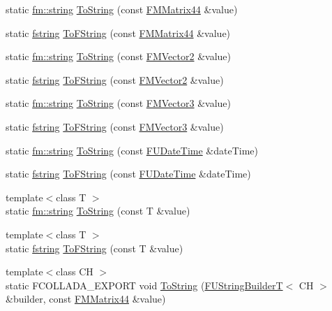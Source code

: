 \begin{DoxyCompactItemize}
\item 
static \hyperlink{classfm_1_1stringT}{fm::string} \hyperlink{classFUStringConversion_a1e32d9e1992b451555aedcf0e851cfe4}{ToString} (const \hyperlink{classFMMatrix44}{FMMatrix44} \&value)
\item 
static \hyperlink{classfm_1_1stringT}{fstring} \hyperlink{classFUStringConversion_ac987762cbe50eb173b9d9580bcafbff4}{ToFString} (const \hyperlink{classFMMatrix44}{FMMatrix44} \&value)
\item 
static \hyperlink{classfm_1_1stringT}{fm::string} \hyperlink{classFUStringConversion_aea5310d3597f1a39097707c051a7a85d}{ToString} (const \hyperlink{classFMVector2}{FMVector2} \&value)
\item 
static \hyperlink{classfm_1_1stringT}{fstring} \hyperlink{classFUStringConversion_a403c2c0111bde04cb202cccdee6eba86}{ToFString} (const \hyperlink{classFMVector2}{FMVector2} \&value)
\item 
static \hyperlink{classfm_1_1stringT}{fm::string} \hyperlink{classFUStringConversion_a3cdd351c2e7ffcf919f6790c35c0004c}{ToString} (const \hyperlink{classFMVector3}{FMVector3} \&value)
\item 
static \hyperlink{classfm_1_1stringT}{fstring} \hyperlink{classFUStringConversion_aefeb37f92cf554c9a9baf72ab0b0b53b}{ToFString} (const \hyperlink{classFMVector3}{FMVector3} \&value)
\item 
static \hyperlink{classfm_1_1stringT}{fm::string} \hyperlink{classFUStringConversion_a8bd72664eec1369a949c808d52653c7e}{ToString} (const \hyperlink{classFUDateTime}{FUDateTime} \&dateTime)
\item 
static \hyperlink{classfm_1_1stringT}{fstring} \hyperlink{classFUStringConversion_adc193933dbd4b733c5990fed111dad7c}{ToFString} (const \hyperlink{classFUDateTime}{FUDateTime} \&dateTime)
\item 
{\footnotesize template$<$class T $>$ }\\static \hyperlink{classfm_1_1stringT}{fm::string} \hyperlink{classFUStringConversion_a63ec0cfa64af9070fa276467d26c530f}{ToString} (const T \&value)
\item 
{\footnotesize template$<$class T $>$ }\\static \hyperlink{classfm_1_1stringT}{fstring} \hyperlink{classFUStringConversion_a1bd49c484ca970133abc02f709dce370}{ToFString} (const T \&value)
\item 
{\footnotesize template$<$class CH $>$ }\\static FCOLLADA\_\-EXPORT void \hyperlink{classFUStringConversion_a685d6e6520cbbdfe81007081c321cefc}{ToString} (\hyperlink{classFUStringBuilderT}{FUStringBuilderT}$<$ CH $>$ \&builder, const \hyperlink{classFMMatrix44}{FMMatrix44} \&value)

\end{DoxyCompactItemize}
